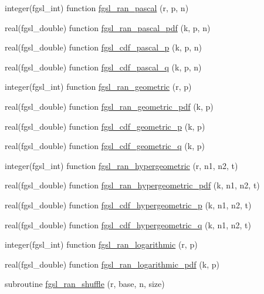 \begin{DoxyCompactItemize}
\item 
integer(fgsl\+\_\+int) function \hyperlink{rng_8finc_a0027f47bae46e3f5160056c4a0f0bb16}{fgsl\+\_\+ran\+\_\+pascal} (r, p, n)
\item 
real(fgsl\+\_\+double) function \hyperlink{rng_8finc_a1c7effe4be2e34250060a625e3787d84}{fgsl\+\_\+ran\+\_\+pascal\+\_\+pdf} (k, p, n)
\item 
real(fgsl\+\_\+double) function \hyperlink{rng_8finc_a064c1823c11347b4746af47bec4ac6cd}{fgsl\+\_\+cdf\+\_\+pascal\+\_\+p} (k, p, n)
\item 
real(fgsl\+\_\+double) function \hyperlink{rng_8finc_a5635e95d11c8e3cd9d0a8ecb58d45987}{fgsl\+\_\+cdf\+\_\+pascal\+\_\+q} (k, p, n)
\item 
integer(fgsl\+\_\+int) function \hyperlink{rng_8finc_ae482dfe1c492849cb92416b03115b90e}{fgsl\+\_\+ran\+\_\+geometric} (r, p)
\item 
real(fgsl\+\_\+double) function \hyperlink{rng_8finc_ad9e7f55be1f69e7b25a9e65a40708cec}{fgsl\+\_\+ran\+\_\+geometric\+\_\+pdf} (k, p)
\item 
real(fgsl\+\_\+double) function \hyperlink{rng_8finc_a4a120f9eb0d44094801ba645513a989f}{fgsl\+\_\+cdf\+\_\+geometric\+\_\+p} (k, p)
\item 
real(fgsl\+\_\+double) function \hyperlink{rng_8finc_a4aebfe7d978d88066a79acaa75308f22}{fgsl\+\_\+cdf\+\_\+geometric\+\_\+q} (k, p)
\item 
integer(fgsl\+\_\+int) function \hyperlink{rng_8finc_a555f87a230be607e1cd924efad37bbda}{fgsl\+\_\+ran\+\_\+hypergeometric} (r, n1, n2, t)
\item 
real(fgsl\+\_\+double) function \hyperlink{rng_8finc_a7d562f6070fb8375424c9bb8002102ee}{fgsl\+\_\+ran\+\_\+hypergeometric\+\_\+pdf} (k, n1, n2, t)
\item 
real(fgsl\+\_\+double) function \hyperlink{rng_8finc_ad32c3936baaedfa550d4b8290fdd6a3d}{fgsl\+\_\+cdf\+\_\+hypergeometric\+\_\+p} (k, n1, n2, t)
\item 
real(fgsl\+\_\+double) function \hyperlink{rng_8finc_aa84f12c0e14bb16890138becd9def9c4}{fgsl\+\_\+cdf\+\_\+hypergeometric\+\_\+q} (k, n1, n2, t)
\item 
integer(fgsl\+\_\+int) function \hyperlink{rng_8finc_a584f76adbf187041b73db1c34576f40c}{fgsl\+\_\+ran\+\_\+logarithmic} (r, p)
\item 
real(fgsl\+\_\+double) function \hyperlink{rng_8finc_a8ac180ac52e5466637bbbf1161289f49}{fgsl\+\_\+ran\+\_\+logarithmic\+\_\+pdf} (k, p)
\item 
subroutine \hyperlink{rng_8finc_aaaec4c2b90a22f0b1d7006fba9b349ef}{fgsl\+\_\+ran\+\_\+shuffle} (r, base, n, size)

\end{DoxyCompactItemize}
